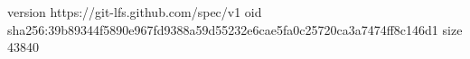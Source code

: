 version https://git-lfs.github.com/spec/v1
oid sha256:39b89344f5890e967fd9388a59d55232e6cae5fa0c25720ca3a7474ff8c146d1
size 43840
